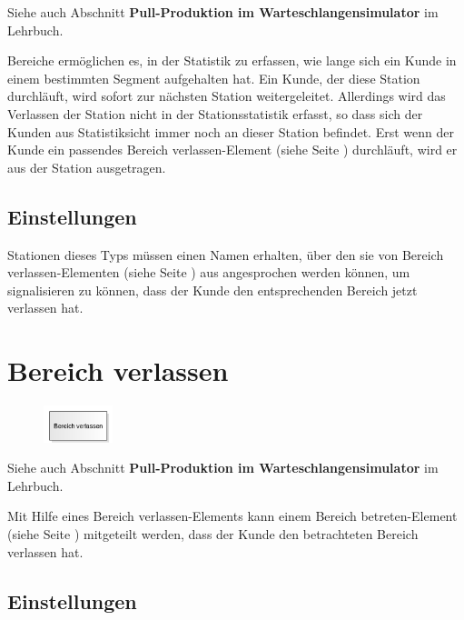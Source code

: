 Siehe auch Abschnitt \textbf{Pull-Produktion im Warteschlangensimulator} im Lehrbuch.

Bereiche ermöglichen es, in der Statistik zu erfassen, wie lange sich ein Kunde in einem bestimmten
Segment aufgehalten hat. Ein Kunde, der diese Station durchläuft, wird sofort zur nächsten Station
weitergeleitet. Allerdings wird das Verlassen der Station nicht in der Stationsstatistik erfasst,
so dass sich der Kunden aus Statistiksicht immer noch an dieser Station befindet. Erst wenn der
Kunde ein passendes Bereich verlassen-Element (siehe Seite \pageref{ref:ModelElementSectionEnd}) durchläuft,
wird er aus der Station ausgetragen.

\subsection*{Einstellungen}

Stationen dieses Typs müssen einen Namen erhalten, über den sie von
Bereich verlassen-Elementen (siehe Seite \pageref{ref:ModelElementSectionEnd}) 
aus angesprochen werden können, um signalisieren zu können, dass der
Kunde den entsprechenden Bereich jetzt verlassen hat.


\section{Bereich verlassen}
\label{ref:ModelElementSectionEnd}

\begin{figure}
\vspace{-22pt}
\includegraphics[width=2cm]{imageModelElementSectionEnd.png}
\vspace{-22pt}
\end{figure}

Siehe auch Abschnitt \textbf{Pull-Produktion im Warteschlangensimulator} im Lehrbuch.

Mit Hilfe eines Bereich verlassen-Elements kann einem
Bereich betreten-Element (siehe Seite \pageref{ref:ModelElementSectionStart}) 
mitgeteilt werden, dass der Kunde den betrachteten Bereich verlassen hat.

\subsection*{Einstellungen}

